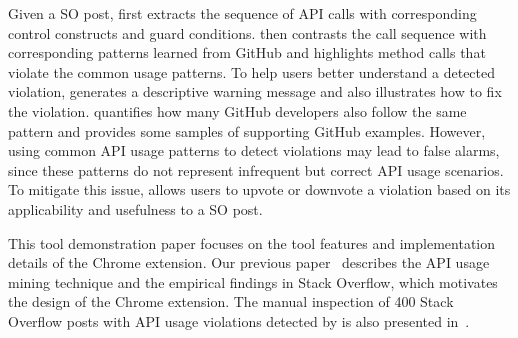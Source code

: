 Given a SO post, {\tool} first extracts the sequence of API calls with corresponding control constructs and guard conditions. {\tool} then contrasts the call sequence with corresponding patterns learned from GitHub and highlights method calls that violate the common usage patterns. To help users better understand a detected violation, {\tool} generates a descriptive warning message and also illustrates how to fix the violation. {\tool} quantifies how many GitHub developers also follow the same pattern and provides some samples of supporting GitHub examples. However, using common API usage patterns to detect violations may lead to false alarms, since these patterns do not represent infrequent but correct API usage scenarios. To mitigate this issue, {\tool} allows users to upvote or downvote a violation based on its applicability and usefulness to a SO post. 

This tool demonstration paper focuses on the tool features and implementation details of the Chrome extension. Our previous paper~\cite{zhang2018code} describes the API usage mining technique and the empirical findings in Stack Overflow, which motivates the design of the Chrome extension. The manual inspection of 400 Stack Overflow posts with API usage violations detected by {\tool} is also presented in~\cite{zhang2018code}. 




%

